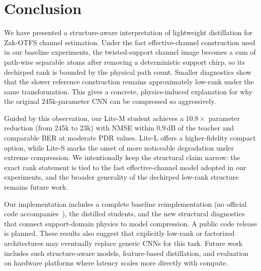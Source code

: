 \documentclass[conference]{IEEEtran}
\begin{document}


\section{Conclusion}
\label{sec:conclusion}

We have presented a structure-aware interpretation of lightweight distillation for Zak-OTFS channel estimation. Under the fast effective-channel construction used in our baseline experiments, the twisted-support channel image becomes a sum of path-wise separable atoms after removing a deterministic support chirp, so its dechirped rank is bounded by the physical path count. Smaller diagnostics show that the slower reference construction remains approximately low-rank under the same transformation. This gives a concrete, physics-induced explanation for why the original 245k-parameter CNN can be compressed so aggressively.

Guided by this observation, our Lite-M student achieves a $10.8\times$ parameter reduction (from 245k to 23k) with NMSE within 0.9\,dB of the teacher and comparable BER at moderate PDR values. Lite-L offers a higher-fidelity compact option, while Lite-S marks the onset of more noticeable degradation under extreme compression. We intentionally keep the structural claim narrow: the exact rank statement is tied to the fast effective-channel model adopted in our experiments, and the broader generality of the dechirped low-rank structure remains future work.

Our implementation includes a complete baseline reimplementation (no official code accompanies~\cite{zakotfs2024}), the distilled students, and the new structural diagnostics that connect support-domain physics to model compression. A public code release is planned. These results also suggest that explicitly low-rank or factorized architectures may eventually replace generic CNNs for this task. Future work includes such structure-aware models, feature-based distillation, and evaluation on hardware platforms where latency scales more directly with compute.



\end{document}
